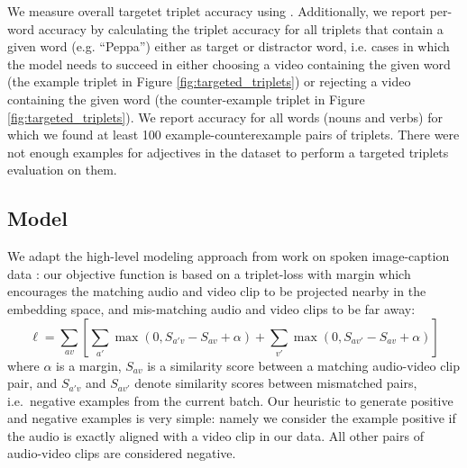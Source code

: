 We measure overall targetet triplet accuracy using
. Additionally, we report per-word accuracy by
calculating the triplet accuracy for all triplets that contain a given
word (e.g. ``Peppa'') either as target or distractor word, i.e. cases
in which the model needs to succeed in either choosing a video
containing the given word (the example triplet in Figure
\ref{fig:targeted_triplets}) or rejecting a video containing the given
word (the counter-example triplet in Figure
\ref{fig:targeted_triplets}).
We report accuracy for all words (nouns and verbs) for which we found at least 100 example-counterexample pairs of triplets. There were not enough examples for adjectives in the dataset to perform a targeted triplets evaluation on them. 



\subsection{Model}

We adapt the high-level modeling approach from work on spoken
image-caption data
\citep{harwath2016unsupervised,chrupala-etal-2017-representations}:
our objective function is based on a triplet-loss with margin which
encourages the matching audio and video clip to be projected nearby in
the embedding space, and mis-matching audio and video clips to be far
away:
\begin{equation}
  \ell = \sum_{av}\left[\sum_{a'} \max(0, S_{a'v} - S_{av} +
    \alpha) + \sum_{v'} \max(0, S_{av'} - S_{av} + \alpha) \right]
  \label{eq:triplet}
\end{equation}
where $\alpha$ is a margin, $S_{av}$ is a similarity score between a
matching audio-video clip pair, and $S_{a'v}$ and $S_{av'}$ denote
similarity scores between mismatched pairs, i.e.\ negative examples
from the current batch. Our heuristic to generate positive and
negative examples is very simple: namely we consider the example
positive if the audio is exactly aligned with a video clip in our
data. All other pairs of audio-video clips are considered negative.

